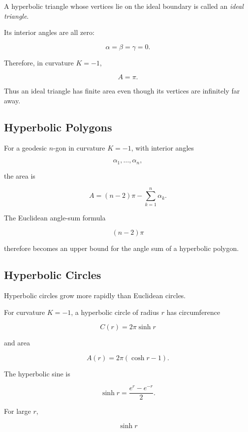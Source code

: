 A hyperbolic triangle whose vertices lie on the ideal boundary is called an
\emph{ideal triangle}.

Its interior angles are all zero:

\[
\alpha=\beta=\gamma=0.
\]

Therefore, in curvature \(K=-1\),

\[
\boxed{
A=\pi.
}
\]

Thus an ideal triangle has finite area even though its vertices are
infinitely far away.

\subsection{Hyperbolic Polygons}
\label{subsec:hyperbolic-polygons}

For a geodesic \(n\)-gon in curvature \(K=-1\), with interior angles

\[
\alpha_1,\ldots,\alpha_n,
\]

the area is

\[
\boxed{
A
=
(n-2)\pi
-
\sum_{k=1}^{n}\alpha_k.
}
\]

The Euclidean angle-sum formula

\[
(n-2)\pi
\]

therefore becomes an upper bound for the angle sum of a hyperbolic polygon.

\subsection{Hyperbolic Circles}
\label{subsec:hyperbolic-circles}

Hyperbolic circles grow more rapidly than Euclidean circles.

For curvature \(K=-1\), a hyperbolic circle of radius \(r\) has circumference

\[
\boxed{
C(r)=2\pi\sinh r
}
\]

and area

\[
\boxed{
A(r)=2\pi(\cosh r-1).
}
\]

The hyperbolic sine is

\[
\boxed{
\sinh r=\frac{e^r-e^{-r}}{2}.
}
\]

For large \(r\),

\[
\sinh r
\]

